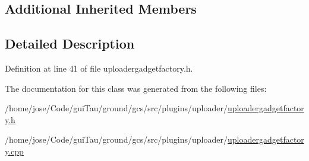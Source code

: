 \subsection*{Additional Inherited Members}


\subsection{Detailed Description}


Definition at line 41 of file uploadergadgetfactory.\-h.



The documentation for this class was generated from the following files\-:\begin{DoxyCompactItemize}
\item 
/home/jose/\-Code/gui\-Tau/ground/gcs/src/plugins/uploader/\hyperlink{uploadergadgetfactory_8h}{uploadergadgetfactory.\-h}\item 
/home/jose/\-Code/gui\-Tau/ground/gcs/src/plugins/uploader/\hyperlink{uploadergadgetfactory_8cpp}{uploadergadgetfactory.\-cpp}\end{DoxyCompactItemize}
